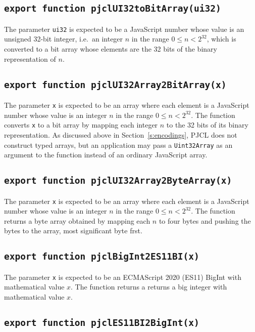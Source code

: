 \documentclass[12pt]{article}
\begin{document}
\subsection{\tt export function pjclUI32toBitArray(ui32)}

The parameter {\tt ui32} is expected to be a JavaScript number 
whose value is an unsigned 32-bit integer,
i.e.\ an integer $n$ in the range $0 \leq n < 2^{32}$, which is
converted to a bit array whose elements are the 32 bits of the binary
representation of $n$.

\subsection{\tt export function pjclUI32Array2BitArray(x)}

The parameter {\tt x} is expected to be an array where each element is
a JavaScript number whose value is an integer $n$ in the range $0 \leq
n < 2^{32}$.  The function converts {\tt x} to a bit array by mapping
each integer $n$ to the 32 bits of its binary representation.  As
discussed above in Section~\ref{s:encodings}, PJCL does not construct typed
arrays, but an application may pass a {\tt Uint32Array} as an argument
to the function instead of an ordinary JavaScript array.

\subsection{\tt export function pjclUI32Array2ByteArray(x)}

The parameter {\tt x} is expected to be an array where each element is
a JavaScript number whose value is an integer $n$ in the range $0 \leq
n < 2^{32}$.  The function returns a byte array obtained by mapping
each $n$ to four bytes and pushing
the bytes to the array, most significant byte frst.

\subsection{\tt export function pjclBigInt2ES11BI(x)}

The parameter {\tt x} is expected to be an ECMAScript 2020 (ES11) BigInt with
mathematical value $x$.
The function returns a returns a big integer with mathematical value $x$.

\subsection{\tt export function pjclES11BI2BigInt(x)}
\end{document}
